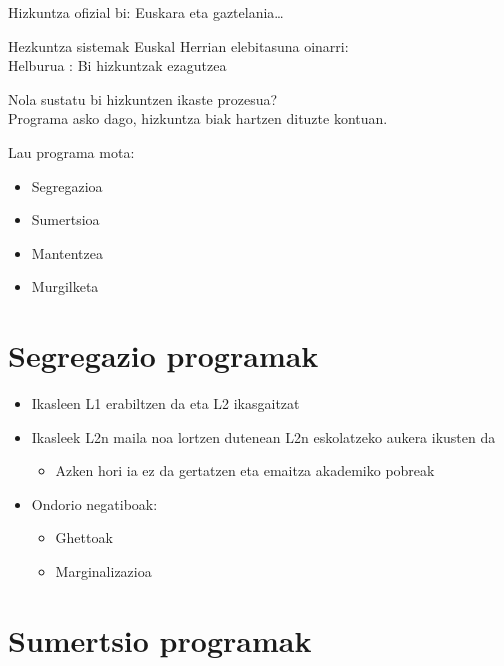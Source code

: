 \documentclass[
]{book}
\providecommand{\tightlist}{%
  \setlength{\itemsep}{0pt}\setlength{\parskip}{0pt}}
\begin{document}
Hizkuntza ofizial bi: Euskara eta gaztelania\ldots{}

Hezkuntza sistemak Euskal Herrian elebitasuna oinarri:\\
Helburua : Bi hizkuntzak ezagutzea

Nola sustatu bi hizkuntzen ikaste prozesua?\\
Programa asko dago, hizkuntza biak hartzen dituzte kontuan.

Lau programa mota:

\begin{itemize}
\tightlist
\item
  Segregazioa
\item
  Sumertsioa
\item
  Mantentzea
\item
  Murgilketa
\end{itemize}

\hypertarget{segregazio-programak}{%
\section{Segregazio programak}\label{segregazio-programak}}

\begin{itemize}
\tightlist
\item
  Ikasleen L1 erabiltzen da eta L2 ikasgaitzat
\item
  Ikasleek L2n maila noa lortzen dutenean L2n eskolatzeko aukera ikusten da

  \begin{itemize}
  \tightlist
  \item
    Azken hori ia ez da gertatzen eta emaitza akademiko pobreak
  \end{itemize}
\item
  Ondorio negatiboak:

  \begin{itemize}
  \tightlist
  \item
    Ghettoak
  \item
    Marginalizazioa
  \end{itemize}
\end{itemize}

\hypertarget{sumertsio-programak}{%
\section{Sumertsio programak}\label{sumertsio-programak}}
\end{document}
